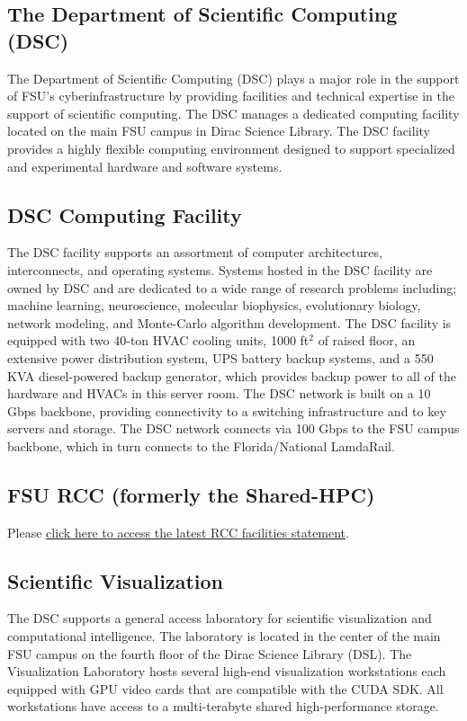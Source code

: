 \documentclass[12pt,a4paper]{article}
\begin{document}
\subsection*{The Department of Scientific Computing (DSC)}
The Department of Scientific Computing (DSC) plays a major role in the support of FSU's cyberinfrastructure by providing facilities and technical expertise in the support of scientific computing. The DSC manages a dedicated computing facility located on the main FSU campus in Dirac Science Library. The DSC facility provides a highly flexible computing environment designed to support specialized and experimental hardware and software systems.

\subsection*{DSC Computing Facility}
The DSC facility supports an assortment of computer architectures, interconnects, and operating systems. Systems hosted in the DSC facility are owned by DSC and are dedicated to a wide range of research problems including; machine learning, neuroscience, molecular biophysics, evolutionary biology, network modeling, and Monte-Carlo algorithm development. The DSC facility is equipped with two 40-ton HVAC cooling units, 1000 ft$^2$ of raised floor, an extensive power distribution system, UPS battery backup systems, and a 550 KVA diesel-powered backup generator, which provides backup power to all of the hardware and HVACs in this server room. The DSC network is built on a 10 Gbps backbone, providing connectivity to a switching infrastructure and to key servers and storage. The DSC network connects via 100 Gbps to the FSU campus backbone, which in turn connects to the Florida/National LamdaRail.

\subsection*{FSU RCC (formerly the Shared-HPC)}
Please \href{https://its.fsu.edu/help/it-support/researchers#grants}{click here to access the latest RCC facilities statement}.

\subsection*{Scientific Visualization}
The DSC supports a general access laboratory for scientific visualization and computational intelligence. The laboratory is located in the center of the main FSU campus on the fourth floor of the Dirac Science Library (DSL). The Visualization Laboratory hosts several high-end visualization workstations each equipped with GPU video cards that are compatible with the CUDA SDK. All workstations have access to a multi-terabyte shared high-performance storage.
\end{document}

